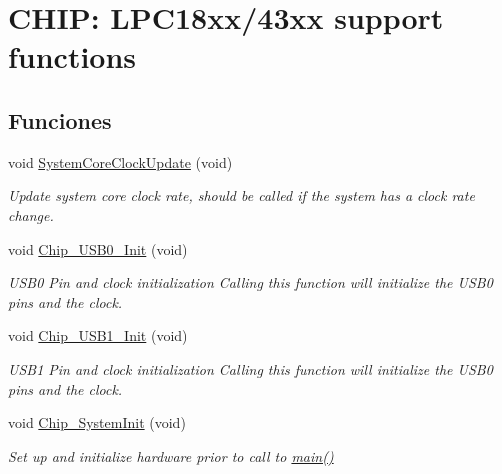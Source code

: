 \hypertarget{group___s_u_p_p_o_r_t__18_x_x__43_x_x___f_u_n_c}{}\section{C\+H\+IP\+: L\+P\+C18xx/43xx support functions}
\label{group___s_u_p_p_o_r_t__18_x_x__43_x_x___f_u_n_c}
\subsection*{Funciones}
\begin{DoxyCompactItemize}
\item 
void \hyperlink{group___s_u_p_p_o_r_t__18_x_x__43_x_x___f_u_n_c_gae0c36a9591fe6e9c45ecb21a794f0f0f}{System\+Core\+Clock\+Update} (void)
\begin{DoxyCompactList}\small\item\em Update system core clock rate, should be called if the system has a clock rate change. \end{DoxyCompactList}\item 
void \hyperlink{group___s_u_p_p_o_r_t__18_x_x__43_x_x___f_u_n_c_ga3d92558011a1b37fdc6a0687691127c4}{Chip\+\_\+\+U\+S\+B0\+\_\+\+Init} (void)
\begin{DoxyCompactList}\small\item\em U\+S\+B0 Pin and clock initialization Calling this function will initialize the U\+S\+B0 pins and the clock. \end{DoxyCompactList}\item 
void \hyperlink{group___s_u_p_p_o_r_t__18_x_x__43_x_x___f_u_n_c_ga89df58e269eb3a9001c3eeafbbc95473}{Chip\+\_\+\+U\+S\+B1\+\_\+\+Init} (void)
\begin{DoxyCompactList}\small\item\em U\+S\+B1 Pin and clock initialization Calling this function will initialize the U\+S\+B0 pins and the clock. \end{DoxyCompactList}\item 
void \hyperlink{group___s_u_p_p_o_r_t__18_x_x__43_x_x___f_u_n_c_ga3450fa020f6b569cc2deb69c11e11b7c}{Chip\+\_\+\+System\+Init} (void)
\begin{DoxyCompactList}\small\item\em Set up and initialize hardware prior to call to \hyperlink{main_8c_a840291bc02cba5474a4cb46a9b9566fe}{main()} \end{DoxyCompactList}\item 

\end{DoxyCompactItemize}
